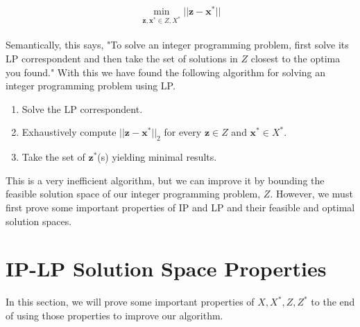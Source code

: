 \documentclass[conference]{IEEEtran}
\numberwithin{equation}{section}
\numberwithin{figure}{section}
\theoremstyle{plain}
\theoremstyle{definition}
\newcommand{\1}{\ensuremath \mathbbm{1}}
\begin{document}
\[\min_{\mathbf{z},\mathbf{x}^* \in Z,X^*}||\mathbf{z} - \mathbf{x}^*||\] \\
Semantically, this says, "To solve an integer programming problem, first solve 
its LP correspondent and then take the set of solutions in $Z$ closest to the 
optima you found." With this we have found the following algorithm for solving 
an integer programming problem using LP. \\
\begin{enumerate}
  \item Solve the LP correspondent. \\
  \item Exhaustively compute $||\mathbf{z} - \mathbf{x}^*||_2$ for every 
    $\mathbf{z} \in Z$ and $\mathbf{x}^* \in X^*$. \\
  \item Take the set of $\mathbf{z}^*$(s) yielding minimal results. \\
\end{enumerate}
This is a very inefficient algorithm, but we can improve it by bounding the 
feasible solution space of our integer programming problem, $Z$. However, we must 
first prove some important properties of IP and LP and their feasible and optimal 
solution spaces. \\

\section{IP-LP Solution Space Properties}
In this section, we will prove some important properties of $X,X^*,Z,Z^*$ to the 
end of using those properties to improve our algorithm. \\
\end{document}
